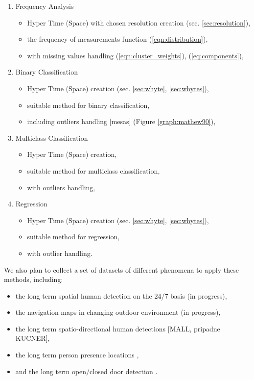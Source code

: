 \begin{enumerate}
    \item Frequency Analysis
    \begin{itemize}
        \item Hyper Time (Space) with chosen resolution creation (sec. \ref{sec:resolution}),
        \item the frequency of measurements function (\ref{eqn:distribution}),
        \item with missing values handling (\ref{eqn:cluster_weights}), (\ref{eq:components}),
    \end{itemize}
    \item Binary Classification
    \begin{itemize}
        \item Hyper Time (Space) creation (sec. \ref{sec:whyte}, \ref{sec:whytes}),
        \item suitable method for binary classification,
        \item including outliers handling [mesas] (Figure \ref{graph:mathew90}),
    \end{itemize}
    \item Multiclass Classification
    \begin{itemize}
        \item Hyper Time (Space) creation,
        \item suitable method for multiclass classification,
        \item with outliers handling,
    \end{itemize}
    \item Regression
    \begin{itemize}
        \item Hyper Time (Space) creation (sec. \ref{sec:whyte}, \ref{sec:whytes}),
        \item suitable method for regression,
        \item with outlier handling.
    \end{itemize}
\end{enumerate}

We also plan to collect a set of datasets of different phenomena to apply these methods, including:
\begin{itemize}
    \item the long term spatial human detection on the 24/7 basis (in progress),
    \item the navigation maps in changing outdoor environment (in progress),
    \item the long term spatio-directional human detections [MALL, pripadne KUCNER],
    \item the long term person presence locations \cite{krajnik2015s},
    \item and the long term open/closed door detection \cite{krajnik2014long}.
\end{itemize} 
    
        

